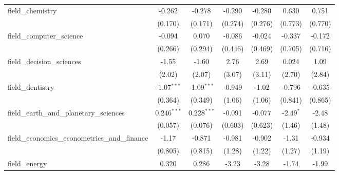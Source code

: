 \begin{tabular}{lcccccc}
   field\_chemistry                                            & -0.262         & -0.278         & -0.290         & -0.280         & 0.630          & 0.751\\   
                                                               & (0.170)        & (0.171)        & (0.274)        & (0.276)        & (0.773)        & (0.770)\\   
   field\_computer\_science                                    & -0.094         & 0.070          & -0.086         & -0.024         & -0.337         & -0.172\\   
                                                               & (0.266)        & (0.294)        & (0.446)        & (0.469)        & (0.705)        & (0.716)\\   
   field\_decision\_sciences                                   & -1.55          & -1.60          & 2.76           & 2.69           & 0.024          & 1.09\\   
                                                               & (2.02)         & (2.07)         & (3.07)         & (3.11)         & (2.70)         & (2.84)\\   
   field\_dentistry                                            & -1.07$^{***}$  & -1.09$^{***}$  & -0.949         & -1.02          & -0.796         & -0.635\\   
                                                               & (0.364)        & (0.349)        & (1.06)         & (1.06)         & (0.841)        & (0.865)\\   
   field\_earth\_and\_planetary\_sciences                      & 0.246$^{***}$  & 0.228$^{***}$  & -0.091         & -0.077         & -2.49$^{*}$    & -2.48\\   
                                                               & (0.057)        & (0.076)        & (0.603)        & (0.623)        & (1.46)         & (1.48)\\   
   field\_economics\_econometrics\_and\_finance                & -1.17          & -0.871         & -0.981         & -0.902         & -1.31          & -0.934\\   
                                                               & (0.805)        & (0.815)        & (1.28)         & (1.22)         & (1.27)         & (1.19)\\   
   field\_energy                                               & 0.320          & 0.286          & -3.23          & -3.28          & -1.74          & -1.99\\   

\end{tabular}
